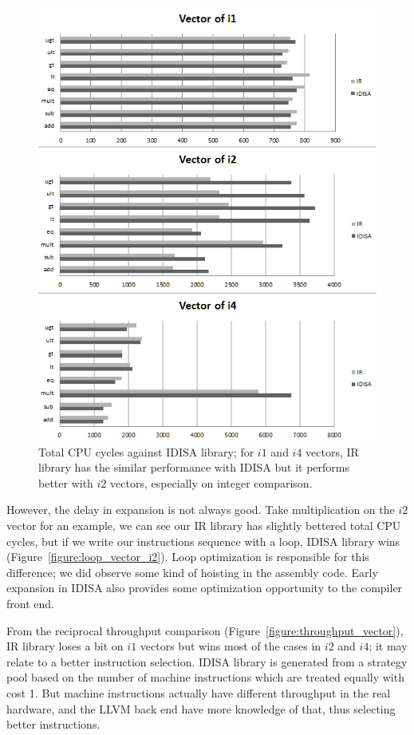 \begin{figure}[htbp!]
\centering
\includegraphics[width=140mm]{draw/cpu_cycles_vector.png}
\caption[Total CPU cycles against IDISA library]{Total CPU cycles against IDISA library; for $i1$ and $i4$ vectors, IR library has the similar performance with IDISA but it performs better with $i2$ vectors, especially on integer comparison.}
\label{figure:cpu_cycles_vector}
\end{figure}

However, the delay in expansion is not always good. Take multiplication on the $i2$ vector for an example, we can see our IR library has slightly bettered total CPU cycles, but if we write our instructions sequence with a loop, IDISA library wins (Figure~\ref{figure:loop_vector_i2}). Loop optimization is responsible for this difference; we did observe some kind of hoisting in the assembly code. Early expansion in IDISA also provides some optimization opportunity to the compiler front end.

From the reciprocal throughput comparison (Figure~\ref{figure:throughput_vector}), IR library loses a bit on $i1$ vectors but wins most of the cases in $i2$ and $i4$; it may relate to a better instruction selection. IDISA library is generated from a strategy pool based on the number of machine instructions which are treated equally with cost 1. But machine instructions actually have different throughput in the real hardware, and the LLVM back end have more knowledge of that, thus selecting better instructions.

